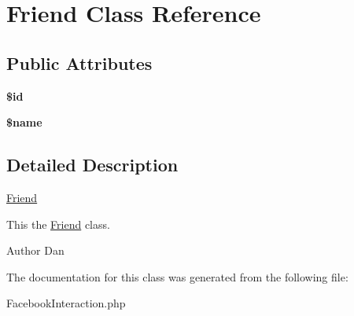 \hypertarget{class_friend}{
\section{Friend Class Reference}
\label{class_friend}
}
\subsection*{Public Attributes}
\begin{DoxyCompactItemize}
\item 
\hypertarget{class_friend_ae56b7713a9522883ee9920addd11c385}{
{\bfseries \$id}}
\label{class_friend_ae56b7713a9522883ee9920addd11c385}

\item 
\hypertarget{class_friend_a64faaacd3a723d55eeca7171c3ae27c1}{
{\bfseries \$name}}
\label{class_friend_a64faaacd3a723d55eeca7171c3ae27c1}

\end{DoxyCompactItemize}


\subsection{Detailed Description}
\hyperlink{class_friend}{Friend}

This the \hyperlink{class_friend}{Friend} class.

\begin{DoxyAuthor}{Author}
Dan 
\end{DoxyAuthor}


The documentation for this class was generated from the following file:\begin{DoxyCompactItemize}
\item 
FacebookInteraction.php\end{DoxyCompactItemize}
